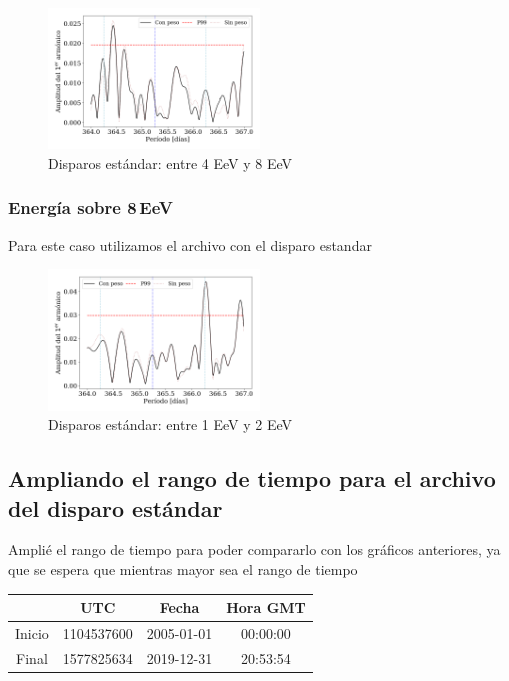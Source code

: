 \begin{figure}[H]
	\centering
	\includegraphics[width=0.5\textwidth]{2019_Main_Array_4_8_EeV_con_vs_sin_peso.png}
	\caption{Disparos estándar: entre 4 EeV y 8 EeV}
	\label{fig:48w}
\end{figure}

\subsubsection{Energía sobre 8\,EeV}

Para este caso utilizamos el archivo con el disparo estandar

\begin{figure}[H]
	\centering
	\includegraphics[width=0.5\textwidth]{2019_Main_Array_8_EeV_con_vs_sin_peso.png}
	\caption{Disparos estándar: entre 1 EeV y 2 EeV}
	\label{fig:48w}
\end{figure}




\subsection{Ampliando el rango de tiempo para el archivo del disparo estándar}

Amplié el rango de tiempo para poder compararlo con los gráficos anteriores, ya que se espera que mientras mayor sea el rango de tiempo
	\begin{table}[H]
	\centering
		\begin{tabular}{c|c|c|c}
	 		& UTC 			& Fecha		 	&  Hora GMT  \\ \hline
	Inicio	& 1104537600	&2005-01-01 	&00:00:00		\\
	Final 	& 1577825634	&2019-12-31 	&20:53:54		\\
		\end{tabular}
	\end{table}


